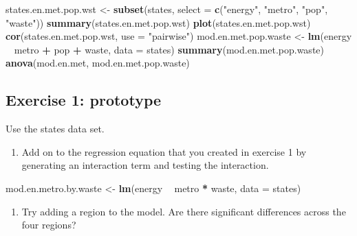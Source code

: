 \documentclass[]{book}
\newenvironment{Shaded}{\begin{snugshade}}{\end{snugshade}}
\newcommand{\KeywordTok}[1]{\textcolor[rgb]{0.13,0.29,0.53}{\textbf{#1}}}
\newcommand{\DataTypeTok}[1]{\textcolor[rgb]{0.13,0.29,0.53}{#1}}
\newcommand{\StringTok}[1]{\textcolor[rgb]{0.31,0.60,0.02}{#1}}
\newcommand{\OperatorTok}[1]{\textcolor[rgb]{0.81,0.36,0.00}{\textbf{#1}}}
\newcommand{\NormalTok}[1]{#1}
\providecommand{\tightlist}{%
  \setlength{\itemsep}{0pt}\setlength{\parskip}{0pt}}
\begin{document}
\begin{Shaded}
\begin{Highlighting}[]
\NormalTok{  states.en.met.pop.wst <-}\StringTok{ }\KeywordTok{subset}\NormalTok{(states, }\DataTypeTok{select =} \KeywordTok{c}\NormalTok{(}\StringTok{"energy"}\NormalTok{, }\StringTok{"metro"}\NormalTok{, }\StringTok{"pop"}\NormalTok{, }\StringTok{"waste"}\NormalTok{))}
  \KeywordTok{summary}\NormalTok{(states.en.met.pop.wst)}
  \KeywordTok{plot}\NormalTok{(states.en.met.pop.wst)}
  \KeywordTok{cor}\NormalTok{(states.en.met.pop.wst, }\DataTypeTok{use =} \StringTok{"pairwise"}\NormalTok{)}
\NormalTok{  mod.en.met.pop.waste <-}\StringTok{ }\KeywordTok{lm}\NormalTok{(energy }\OperatorTok{~}\StringTok{ }\NormalTok{metro }\OperatorTok{+}\StringTok{ }\NormalTok{pop }\OperatorTok{+}\StringTok{ }\NormalTok{waste, }\DataTypeTok{data =}\NormalTok{ states)}
  \KeywordTok{summary}\NormalTok{(mod.en.met.pop.waste)}
  \KeywordTok{anova}\NormalTok{(mod.en.met, mod.en.met.pop.waste)}
\end{Highlighting}
\end{Shaded}

\subsection{Exercise 1: prototype}\label{exercise-1-prototype}

Use the states data set.

\begin{enumerate}
\def\labelenumi{\arabic{enumi}.}
\tightlist
\item
  Add on to the regression equation that you created in exercise 1 by
  generating an interaction term and testing the interaction.
\end{enumerate}

\begin{Shaded}
\begin{Highlighting}[]
\NormalTok{  mod.en.metro.by.waste <-}\StringTok{ }\KeywordTok{lm}\NormalTok{(energy }\OperatorTok{~}\StringTok{ }\NormalTok{metro }\OperatorTok{*}\StringTok{ }\NormalTok{waste, }\DataTypeTok{data =}\NormalTok{ states)}
\end{Highlighting}
\end{Shaded}

\begin{enumerate}
\def\labelenumi{\arabic{enumi}.}
\tightlist
\item
  Try adding a region to the model. Are there significant differences
  across the four regions?
\end{enumerate}
\end{document}
